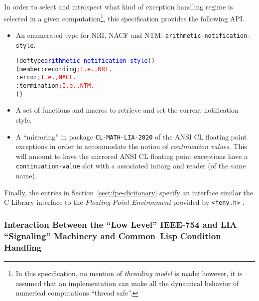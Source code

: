 \documentclass[10pt,fleqn]{article}
\newcommand{\CL}{\textsf{Common~Lisp}}
\newcommand{\CLang}{\textsf{C}}
\newcommand{\code}[1]{\texttt{#1}}
\newcommand{\codelia}[1]{\textcolor{blue}{#1}}
\newcommand{\IEEEFPStd}{IEEE-754}
\newcommand{\CLLIAPKG}{\code{CL-MATH-LIA-2020}}
\begin{document}
In order to select and introspect what kind of exception handling
regime is selected in a given computation\footnote{In this
  specification, no mention of \emph{threading model} is made;
  however, it is assumed that an implementation can make all the
  dynamical behavior of numerical computations ``thread safe''.}, this
specification provides the following API.
\begin{itemize}
\item An enumerated type for NRI, NACF and NTM: %
  \code{arithmetic-notification-style}.
  \begin{alltt}
    (deftype \codelia{arithmetic-notification-style} ()
      (member :recording    \textcolor{red}{; I.e., NRI.}
              :error        \textcolor{red}{; I.e., NACF.}
              :termination  \textcolor{red}{; I.e., NTM.}
              ))
  \end{alltt}
\item A set of functions and macros to retrieve and set the current
  notification style.
\item A ``mirroring'' in package \CLLIAPKG{} of the ANSI CL floating
  point exceptions in order to accommodate the notion of
  \emph{continuation values}.  This will amount to have the mirrored
  ANSI CL floating point exceptions have a \code{continuation-value}
  slot with a associated initarg and reader (of the same name).
\end{itemize}

\vspace*{2mm}

\noindent
Finally, the entries in Section~\ref{sect:fpe-dictionary} specify an interface
similar the \CLang{} Library interface to the \emph{Floating Point
  Environment} provided by \verb|<fenv.h>| \cite{2018:C18}.


\subsubsection{Interaction Between the ``Low Level'' \IEEEFPStd{} and LIA
  ``Signaling'' Machinery and \CL{} Condition Handling}
\end{document}
